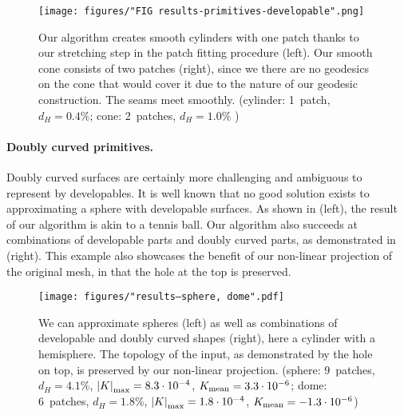 \begin{figure} [h]
\centering
\noindent\texttt{[image: figures/"FIG results-primitives-developable".png]}
\caption{
    Our algorithm creates smooth cylinders with one patch thanks to our stretching step in the patch fitting procedure (left). Our smooth cone consists of two patches (right), since we there are no geodesics on the cone that would cover it due to the nature of our geodesic construction. The seams meet smoothly.
    (cylinder: 1~patch, $d_H = 0.4\%$; %
    cone: 2~patches, $d_H = 1.0\%$  %
    )
    \label{fig:results_primitives_developable}}
\end{figure}


\paragraph{Doubly curved primitives. }

Doubly curved surfaces are certainly more challenging and ambiguous to represent by developables. It is well known that no good solution exists to approximating a sphere with developable surfaces. As shown in  (left), the result of our algorithm is akin to a tennis ball. Our algorithm also succeeds at combinations of developable parts and doubly curved parts, as demonstrated in  (right). This example also showcases the benefit of our non-linear projection of the original mesh, in that the hole at the top is preserved.

\begin{figure} 
\centering
\noindent\texttt{[image: figures/"results--sphere, dome".pdf]}
\caption{
    We can approximate spheres (left) as well as combinations of developable and doubly curved shapes (right), here a cylinder with a hemisphere. The topology of the input, as demonstrated by the hole on top, is preserved by our non-linear projection. 
    (sphere: 9~patches, $d_H = 4.1\%$, $ \left\vert K\right\vert_\text{max} = 8.3\cdot 10^{-4} $, $ K_\text{mean} = 3.3\cdot 10^{-6} $;
    dome: 6~patches, $d_H = 1.8\%$, $ \left\vert K\right\vert_\text{max} = 1.8\cdot 10^{-4} $, $ K_\text{mean} = -1.3\cdot 10^{-6} $)
    \label{fig:results_primitives_doublycurved}}
\end{figure}


